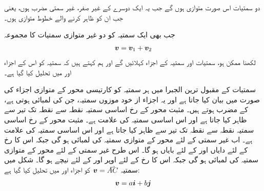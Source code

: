 دو سمتیات اس صورت متوازی ہوں گے جب یہ ایک دوسرے کے غیر صفر، غیر سمتی مضرب ہوں، یعنی جب ان کو ظاہر کرنے والے خطوط متوازی ہوں۔

جب بھی ایک سمتیہ  کو دو غیر متوازی سمتیات کا مجموعہ
\begin{align*}
{\ensuremath{{\boldsymbol{v}}}}={{\boldsymbol{v}}}_1+{{\boldsymbol{v}}}_2
\end{align*}
لکھنا ممکن ہو، سمتیات  اور  سمتیہ  کے اجزاء کہلائیں گے  اور ہم کہتے ہیں کہ  سمتیہ   کو اس کے  اجزاء  اور  میں تحلیل کیا گیا ہے۔

سمتیات کے  مقبول ترین الجبرا میں ہر سمتیہ کو کارتیسی محور کے متوازی اجزاء کی صورت میں بیان کیا جاتا ہے اور یہ اجزاء از خود موزوں  سمتیہ، جن کی لمبائی  ہوتی ہے، کے مضرب ہوتے ہیں۔ مثبت  محور کے رخ اساسی سمتیہ نقطہ  سے نقطہ  تک تیر سے ظاہر کیا جاتا ہے  اور اس اساسی سمتیہ کی علامت   ہے۔ مثبت  محور کے رخ اساسی سمتیہ نقطہ  سے نقطہ  تک تیر سے ظاہر کیا جاتا ہے اور اس اساسی سمتیہ کی علامت   ہے۔ اب غیر سمتی  کے لئے  محور  کے متوازی  سمتیہ   کی لمبائی  ہو گی جبکہ اس کا رخ  کے لئے  دایاں اور   کے لئے بایاں ہو گا۔ اس طرح غیر سمتی  کے لئے  محور  کے متوازی  سمتیہ   کی لمبائی  ہو گی جبکہ اس کا رخ  کے لئے  اوپر اور   کے لئے نیچے ہو گا۔ شکل  میں سمتیہ 
$\kvec{v}=\krightharpoonup{AC}$
کو اجزاء  اور  میں تحلیل کیا گیا ہے:
\begin{align*}
{\ensuremath{{\boldsymbol{v}}}}=a{\boldsymbol{i}}+b{\boldsymbol{j}}
\end{align*}

